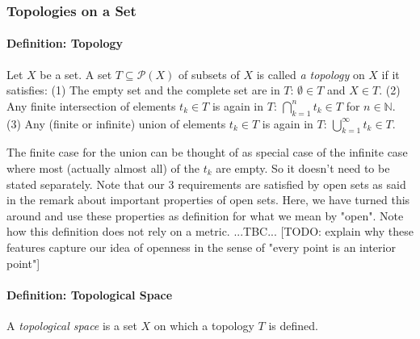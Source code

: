 \subsubsection{Topologies on a Set}

\paragraph{Definition: Topology} 
Let $X$ be a set. A set $T \subseteq \mathcal{P}(X)$ of subsets of $X$ is called \emph{a topology} on $X$ if it satisfies: (1) The empty set and the complete set are in $T$: $\emptyset \in T$ and $X \in T$. (2) Any finite intersection of elements $t_k \in T$ is again in $T$: $\bigcap_{k=1}^n t_k \in T$ for $n \in \mathbb{N}$. (3) Any (finite or infinite) union of elements $t_k \in T$ is again in $T$: $\bigcup_{k=1}^\infty t_k \in T$. 

\medskip
The finite case for the union can be thought of as special case of the infinite case where most (actually almost all) of the $t_k$ are empty. So it doesn't need to be stated separately. Note that our 3 requirements are satisfied by open sets as said in the remark about important properties of open sets. Here, we have turned this around and use these properties as definition for what we mean by "open". Note how this definition does not rely on a metric. ...TBC... [TODO: explain why these features capture our idea of openness in the sense of "every point is an interior point"]





\paragraph{Definition: Topological Space} A \emph{topological space} is a set $X$ on which a topology $T$ is defined.

